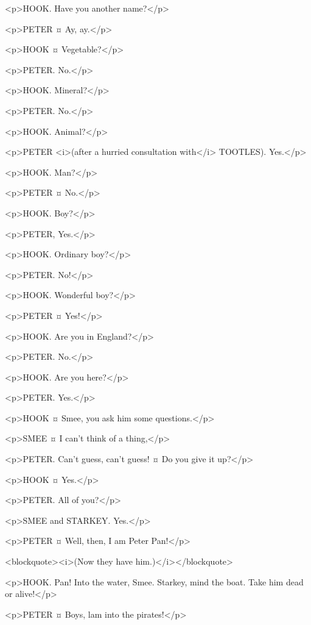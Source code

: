 <p>HOOK. Have you another name?</p>

<p>PETER ¤
Ay, ay.</p>

<p>HOOK ¤
Vegetable?</p>

<p>PETER. No.</p>

<p>HOOK. Mineral?</p>

<p>PETER. No.</p>

<p>HOOK. Animal?</p>

<p>PETER <i>(after a hurried consultation with</i> TOOTLES). Yes.</p>

<p>HOOK. Man?</p>

<p>PETER ¤
No.</p>

<p>HOOK. Boy?</p>

<p>PETER, Yes.</p>

<p>HOOK. Ordinary boy?</p>

<p>PETER. No!</p>

<p>HOOK. Wonderful boy?</p>

<p>PETER ¤
Yes!</p>

<p>HOOK. Are you in England?</p>

<p>PETER. No.</p>

<p>HOOK. Are you here?</p>

<p>PETER. Yes.</p>

<p>HOOK ¤
Smee, you ask him some questions.</p>

<p>SMEE ¤
I can't think of a thing,</p>

<p>PETER. Can't guess, can't guess!
¤
Do you give it up?</p>

<p>HOOK ¤
Yes.</p>

<p>PETER. All of you?</p>

<p>SMEE and STARKEY. Yes.</p>

<p>PETER ¤
Well, then, I am Peter Pan!</p>

<blockquote><i>(Now they have him.)</i></blockquote>

<p>HOOK. Pan! Into the water, Smee. Starkey, mind the boat. Take him dead or alive!</p>

<p>PETER ¤
Boys, lam into the pirates!</p>

